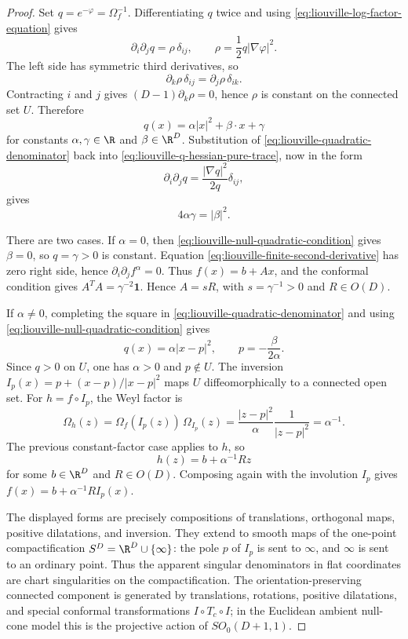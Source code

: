 \begin{proof}
Set \(q=e^{-\varphi}=\Omega_f^{-1}\).  Differentiating \(q\) twice and using
\eqref{eq:liouville-log-factor-equation} gives
\begin{equation}
  \partial_i\partial_j q
  =
  \rho\,\delta_{ij},
  \qquad
  \rho=\frac12q|\nabla\varphi|^2 .
  \label{eq:liouville-q-hessian-pure-trace}
\end{equation}
The left side has symmetric third derivatives, so
\[
  \partial_k\rho\,\delta_{ij}
  =
  \partial_j\rho\,\delta_{ik}.
\]
Contracting \(i\) and \(j\) gives
\((D-1)\partial_k\rho=0\), hence \(\rho\) is constant on the connected set
\(U\).  Therefore
\begin{equation}
  q(x)=\alpha |x|^2+\beta\cdot x+\gamma
  \label{eq:liouville-quadratic-denominator}
\end{equation}
for constants \(\alpha,\gamma\in\R\) and \(\beta\in\R^D\).  Substitution of
\eqref{eq:liouville-quadratic-denominator} back into
\eqref{eq:liouville-q-hessian-pure-trace}, now in the form
\[
  \partial_i\partial_jq
  =
  \frac{|\nabla q|^2}{2q}\delta_{ij},
\]
gives
\begin{equation}
  4\alpha\gamma=|\beta|^2.
  \label{eq:liouville-null-quadratic-condition}
\end{equation}

There are two cases.  If \(\alpha=0\), then
\eqref{eq:liouville-null-quadratic-condition} gives \(\beta=0\), so
\(q=\gamma>0\) is constant.  Equation
\eqref{eq:liouville-finite-second-derivative} has zero right side, hence
\(\partial_i\partial_j f^\alpha=0\).  Thus \(f(x)=b+Ax\), and the conformal
condition gives \(A^TA=\gamma^{-2}\mathbf 1\).  Hence
\(A=sR\), with \(s=\gamma^{-1}>0\) and \(R\in O(D)\).

If \(\alpha\ne0\), completing the square in
\eqref{eq:liouville-quadratic-denominator} and using
\eqref{eq:liouville-null-quadratic-condition} gives
\[
  q(x)=\alpha |x-p|^2,
  \qquad
  p=-\frac{\beta}{2\alpha}.
\]
Since \(q>0\) on \(U\), one has \(\alpha>0\) and \(p\notin U\).  The inversion
\(I_p(x)=p+(x-p)/|x-p|^2\) maps \(U\) diffeomorphically to a connected open
set.  For \(h=f\circ I_p\), the Weyl factor is
\[
  \Omega_h(z)
  =
  \Omega_f(I_p(z))\,\Omega_{I_p}(z)
  =
  \frac{|z-p|^2}{\alpha}\frac1{|z-p|^2}
  =
  \alpha^{-1}.
\]
The previous constant-factor case applies to \(h\), so
\[
  h(z)=b+\alpha^{-1}Rz
\]
for some \(b\in\R^D\) and \(R\in O(D)\).  Composing again with the involution
\(I_p\) gives \(f(x)=b+\alpha^{-1}R I_p(x)\).

The displayed forms are precisely compositions of translations, orthogonal
maps, positive dilatations, and inversion.  They extend to smooth maps of the
one-point compactification \(S^D=\R^D\cup\{\infty\}\): the pole \(p\) of
\(I_p\) is sent to \(\infty\), and \(\infty\) is sent to an ordinary point.
Thus the apparent singular denominators in flat coordinates are chart
singularities on the compactification.  The orientation-preserving connected
component is generated by translations, rotations, positive dilatations, and
special conformal transformations \(I\circ T_c\circ I\); in the Euclidean
ambient null-cone model this is the projective action of \(SO_0(D+1,1)\).
\end{proof}

